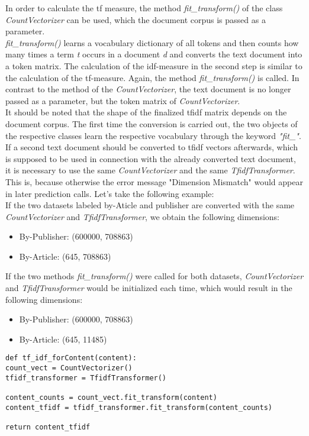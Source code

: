 \documentclass[a4paper, 11pt,titlepage,oneside,openany]{book}
\begin{document}
In order to calculate the \gls{tf} measure, the method \textit{fit\_transform()} of the class \textit{CountVectorizer} can be used, which the document corpus is passed as a parameter. \\
\noindent \textit{fit\_transform()} learns a vocabulary dictionary of all tokens and then counts how many times a term \textit{t} occurs in a document \textit{d} and converts the text document into a token matrix.
\noindent The calculation of the \gls{idf}-measure in the second step is similar to the calculation of the \gls{tf}-measure. Again, the method \textit{fit\_transform()} is called. In contrast to the method of the \textit{CountVectorizer}, the text document is no longer passed as a parameter, but the token matrix of \textit{CountVectorizer}. \\
\indent It should be noted that the shape of the finalized \gls{tfidf} matrix depends on the document corpus. The first time the conversion is carried out, the two objects of the respective classes learn the respective vocabulary through the keyword \textit{"fit\_"}. If a second text document should be converted to \gls{tfidf} vectors afterwards, which is supposed to be used in connection with the already converted text document, it is necessary to use the same \textit{CountVectorizer} and the same \textit{TfidfTransformer}. This is, because otherwise the error message "Dimension Mismatch" would appear in later prediction calls.
Let's take the following example: \\
\noindent If the two datasets labeled by-Aticle and publisher are converted with the same \textit{CountVectorizer} and \textit{TfidfTransformer}, we obtain the following dimensions:
\begin{itemize}
	\item By-Publisher: (600000, 708863)
	\item By-Article: (645, 708863)	
\end{itemize}
\newpage
\noindent If the two methods \textit{fit\_transform()} were called for both datasets, \textit{CountVectorizer} and \textit{TfidfTransformer} would be initialized each time, which would result in the following dimensions:
\begin{itemize}
	\item By-Publisher: (600000, 708863)
	\item By-Article: (645, 11485)	
\end{itemize}
\begin{lstlisting}[caption=\gls{tfidf}]
def tf_idf_forContent(content):
count_vect = CountVectorizer()
tfidf_transformer = TfidfTransformer()

content_counts = count_vect.fit_transform(content)
content_tfidf = tfidf_transformer.fit_transform(content_counts)

return content_tfidf
\end{lstlisting}
\end{document}
